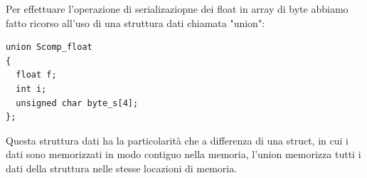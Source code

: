 \documentclass[10pt,a4paper]{article}
\begin{document}
Per effettuare l'operazione di serializaziopne dei float in array di byte abbiamo fatto ricorso all'uso di una struttura dati chiamata "union":
\begin{lstlisting}[style=myArduino, caption=union, captionpos=b]
union Scomp_float
{
  float f;
  int i;
  unsigned char byte_s[4];
};
\end{lstlisting}
Questa struttura dati ha la particolarit\`a che a differenza di una struct, in cui i dati sono memorizzati in modo contiguo nella memoria, l'union memorizza tutti i dati della struttura nelle stesse locazioni di memoria.

\clearpage

\newsavebox{\mylistingboxstruct}
\newsavebox{\mylistingboxunion}

\newsavebox{\mytikzboxonestruct}
\newsavebox{\mytikzboxtwounion}
\end{document}
